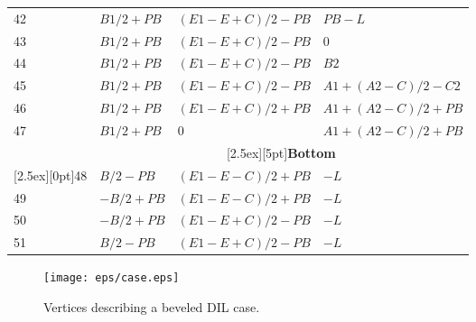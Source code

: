 \documentclass[a4paper]{article}
\begin{document}
\begin{longtable}{|l|l|l|l|}
42 & $B1/2+PB$  & $(E1-E+C)/2-PB$    & $PB-L$\\
43 & $B1/2+PB$  & $(E1-E+C)/2-PB$    & $0$\\
44 & $B1/2+PB$  & $(E1-E+C)/2-PB$    & $B2$\\
45 & $B1/2+PB$  & $(E1-E+C)/2-PB$    & $A1+(A2-C)/2-C2$\\
46 & $B1/2+PB$  & $(E1-E+C)/2+PB$    & $A1+(A2-C)/2+PB$\\
47 & $B1/2+PB$  & $0$                & $A1+(A2-C)/2+PB$\\
\cline{2-4}
&\multicolumn{3}{|c|}{\raisebox{0pt}[2.5ex][5pt]{\textbf{Bottom}}}\\\cline{2-4}
\raisebox{0pt}[2.5ex][0pt]{48}
   & $B/2-PB$  & $(E1-E-C)/2+PB$     & $-L$\\
49 & $-B/2+PB$ & $(E1-E-C)/2+PB$     & $-L$\\
50 & $-B/2+PB$ & $(E1-E+C)/2-PB$     & $-L$\\
51 & $B/2-PB$  & $(E1-E+C)/2-PB$     & $-L$\\
\hline
\end{longtable}


\begin{figure}
\begin{center}
\texttt{[image: eps/case.eps]}
\end{center}
\caption{Vertices describing a beveled DIL case.}
\label{fig:dilcase}
\end{figure}
\end{document}
